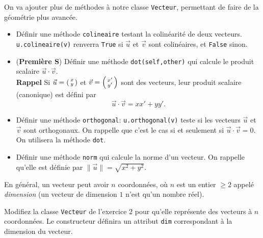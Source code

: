 \begin{frame}[fragile]
	\begin{exo}
		On va ajouter plus de méthodes à notre classe \lstinline|Vecteur|, permettant de faire de la géométrie plus avancée.
		\begin{itemize}
			\item Définir une méthode \lstinline|colineaire| testant la colinéarité de deux vecteurs. \lstinline|u.colineaire(v)| renverra \lstinline|True| si $\vec{u}$ et $\vec{v}$ sont colinéaires, et \lstinline|False| sinon.\pause
			\item (\textbf{Première S}) Définir une méthode \lstinline|dot(self,other)| qui calcule le produit scalaire $\vec u\cdot\vec v$.\\
			\textbf{Rappel} Si $\vec u = \begin{psmallmatrix}
			x \\ y
			\end{psmallmatrix}$ et $\vec v = \begin{psmallmatrix}
			x' \\ y'
			\end{psmallmatrix}$ sont des vecteurs, leur produit scalaire (canonique) est défini par
			$$\vec u \cdot\vec v = xx' + yy'.$$
			\item Définir une méthode \lstinline|orthogonal|: \lstinline|u.orthogonal(v)| teste si les vecteurs $\vec u$ et $\vec v$ sont orthogonaux. On rappelle que c'est le cas si et seulement si $\vec u\cdot\vec v = 0$. On utilisera la méthode \lstinline|dot|.
			\item Définir une méthode \lstinline|norm| qui calcule la norme d'un vecteur. On rappelle qu'elle est définie par $\|\vec u\| = \sqrt{x^2+y^2}$. 
		\end{itemize}
	\end{exo}
\end{frame}

\begin{frame}[fragile]
	\begin{exo}
		En général, un vecteur peut avoir $n$ coordonnées, où $n$ est un entier $\geq 2$ appelé \textit{dimension} (un vecteur de dimension $1$ n'est qu'un nombre réel).
		
		Modifiez la classe \lstinline|Vecteur| de l'exercice 2 pour qu'elle représente des vecteurs à $n$ coordonnées. Le constructeur définira un attribut \lstinline|dim| correspondant à la dimension du vecteur.
	\end{exo}
\end{frame}

